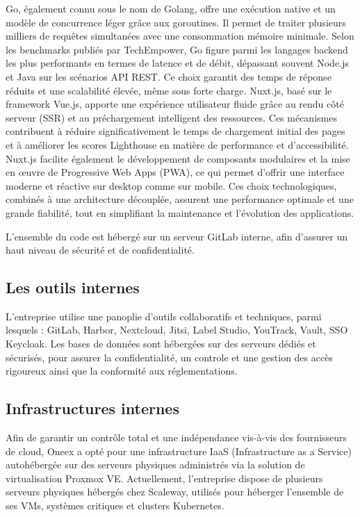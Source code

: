 Go, également connu sous le nom de Golang, offre une exécution native et un modèle de concurrence léger grâce aux goroutines. Il permet de traiter plusieurs milliers de requêtes simultanées avec une consommation mémoire minimale. Selon les benchmarks publiés par TechEmpower, Go figure parmi les langages backend les plus performants en termes de latence et de débit, dépassant souvent Node.js et Java sur les scénarios API REST. Ce choix garantit des temps de réponse réduits et une scalabilité élevée, même sous forte charge.
Nuxt.js, basé sur le framework Vue.js, apporte une expérience utilisateur fluide grâce au rendu côté serveur (SSR) et au préchargement intelligent des ressources. Ces mécanismes contribuent à réduire significativement le temps de chargement initial des pages et à améliorer les scores Lighthouse en matière de performance et d’accessibilité. Nuxt.js facilite également le développement de composants modulaires et la mise en œuvre de Progressive Web Apps (PWA), ce qui permet d’offrir une interface moderne et réactive sur desktop comme sur mobile.
Ces choix technologiques, combinés à une architecture découplée, assurent une performance optimale et une grande fiabilité, tout en simplifiant la maintenance et l’évolution des applications.

L’ensemble du code est hébergé sur un serveur GitLab interne, afin d’assurer un haut niveau de sécurité et de confidentialité.
\subsection{Les outils internes}

L’entreprise utilise une panoplie d'outils collaboratifs et techniques, parmi lesquels :
GitLab, Harbor, Nextcloud, Jitsi, Label Studio, YouTrack, Vault, SSO Keycloak.
Les bases de données sont hébergées sur des serveurs dédiés et sécurisés, pour assurer la confidentialité, un controle et une gestion des accès rigoureux ainsi que la conformité aux réglementations.

\subsection{Infrastructures internes}

Afin de garantir un contrôle total et une indépendance vis-à-vis des fournisseurs de cloud, Oneex a opté pour une infrastructure IaaS (Infrastructure as a Service) autohébergée sur des serveurs physiques administrés via la solution de virtualisation Proxmox VE.
Actuellement, l'entreprise dispose de plusieurs serveurs physiques hébergés chez Scaleway, utilisés pour héberger l’ensemble de ses VMs, systèmes critiques et clusters Kubernetes.

